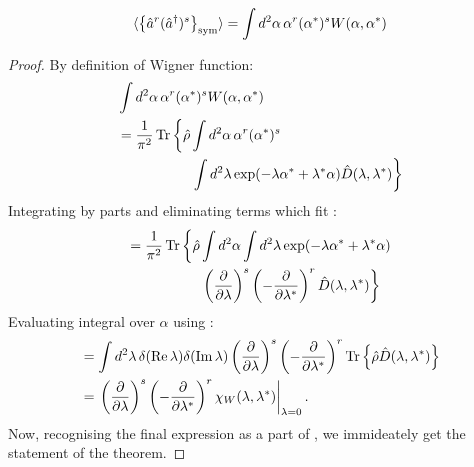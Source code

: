 \begin{theorem}
\label{thm:sm-wigner:moments}
	\[
		\langle \left\{  \hat{a}^r (\hat{a}^\dagger)^s  \right\}_{\mathrm{sym}} \rangle
		= \int d^2\alpha\, \alpha^r (\alpha^*)^s W(\alpha, \alpha^*)
	\]
\end{theorem}
\begin{proof}
By definition of Wigner function:
\begin{equation}
\begin{split}
	& \int d^2\alpha\, \alpha^r (\alpha^*)^s W(\alpha, \alpha^*) \\
	& = \frac{1}{\pi^2} \Trace{ \hat{\rho}
			\int d^2\alpha\, \alpha^r (\alpha^*)^s
		\right. \\
	& \hphantom{=\frac{1}{\pi^2} \Trace{ \hat{\rho} }} %
		\left.
			\int d^2\lambda \exp(-\lambda \alpha^* + \lambda^* \alpha)
			\hat{D}(\lambda, \lambda^*)
		}
\end{split}
\end{equation}
Integrating by parts and eliminating terms which fit :
\begin{equation}
\begin{split}
	& = \frac{1}{\pi^2} \Trace{ \hat{\rho}
			\int d^2\alpha \int d^2\lambda
			\exp(-\lambda \alpha^* + \lambda^* \alpha)
		\right. \\
	& \hphantom{=\frac{1}{\pi^2} \Trace{ \hat{\rho} }} %
		\left.
			\left( \frac{\partial}{\partial \lambda} \right)^s
			\left( -\frac{\partial}{\partial \lambda^*} \right)^r
			\hat{D} (\lambda, \lambda^*)
		}
\end{split}
\end{equation}
Evaluating integral over $\alpha$ using :
\begin{equation*}
\begin{split}
	& = \int d^2\lambda\,
		\delta (\operatorname{Re} \lambda) \delta (\operatorname{Im} \lambda)
		\left( \frac{\partial}{\partial \lambda} \right)^s
		\left( -\frac{\partial}{\partial \lambda^*} \right)^r
		\operatorname{Tr} \left\{ 
			\hat{\rho}
			\hat{D}(\lambda, \lambda^*)
		 \right\} \\
	& = \left.
		\left( \frac{\partial}{\partial \lambda} \right)^s
		\left( -\frac{\partial}{\partial \lambda^*} \right)^r
		\chi_W (\lambda, \lambda^*)
	\right|_{\lambda=0}.
\end{split}
\end{equation*}
Now, recognising the final expression as a part of ,
we immideately get the statement of the theorem.
\end{proof}

